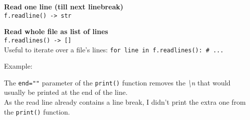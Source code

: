         \textbf{Read one line (till next linebreak)} \\
        \texttt{f.readline() -> str}

        \textbf{Read whole file as list of lines} \\
        \texttt{f.readlines() -> []} \\
        Useful to iterate over a file's lines: \texttt{for line in f.readlines(): # ...}

        Example:

        The \texttt{end=""} parameter of the \texttt{print()} function
        removes the \textit{\textbackslash n} that would usually be printed at the end of the line. \\
        As the read line already contains a line break, I didn't print the extra one from the
        \texttt{print()} function.
